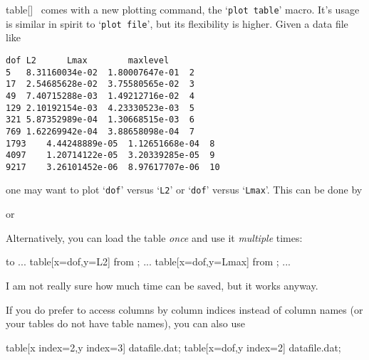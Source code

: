 \begin{addplotoperation}[noindex]{table}{[]}
\PGFPlots\ comes with a new plotting command, the `\texttt{plot table}' macro. It's usage is similar in spirit to `\texttt{plot file}', but its flexibility is higher. Given a data file like
\begin{lstlisting}[tabsize=8]
dof	L2		Lmax		maxlevel
5	8.31160034e-02	1.80007647e-01	2
17	2.54685628e-02	3.75580565e-02	3
49	7.40715288e-03	1.49212716e-02	4
129	2.10192154e-03	4.23330523e-03	5
321	5.87352989e-04	1.30668515e-03	6
769	1.62269942e-04	3.88658098e-04	7
1793	4.44248889e-05	1.12651668e-04	8
4097	1.20714122e-05	3.20339285e-05	9
9217	3.26101452e-06	8.97617707e-06	10
\end{lstlisting}
one may want to plot `\texttt{dof}' versus `\texttt{L2}' or `\texttt{dof}' versus `\texttt{Lmax}'. This can be done by
\begin{codeexample}
\end{codeexample}
or
\begin{codeexample}
\end{codeexample}
Alternatively, you can load the table \emph{once} and use it \emph{multiple} times:
\begin{codeexample}
 to \table
...
\addplot table[x=dof,y=L2] from \table;
...
\addplot table[x=dof,y=Lmax] from \table;
...
\end{codeexample}
I am not really sure how much time can be saved, but it works anyway.

If you do prefer to access columns by column indices instead of column names (or your tables do not have table names), you can also use
\begin{codeexample}
\addplot table[x index=2,y index=3] {datafile.dat};
\addplot table[x=dof,y index=2] {datafile.dat};
\end{codeexample}


\end{addplotoperation}
